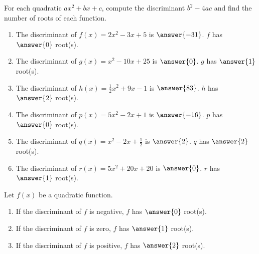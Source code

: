 \documentclass{ximera}
\author{Kenneth Berglund}
\begin{document}
For each quadratic $ax^2 + bx + c$, compute the discriminant $b^2 - 4ac$ and find the number of roots of each function. 

\begin{exercise}
\begin{enumerate}
\item The discriminant of $f(x) = 2x^2 - 3x + 5$ is $\answer{-31}$. $f$ has $\answer{0}$ root(s).

\item The discriminant of $g(x) = x^2 - 10x + 25$ is $\answer{0}$. $g$ has $\answer{1}$ root(s).

\item The discriminant of $h(x) = \frac{1}{2}x^2 + 9x - 1$ is $\answer{83}$. $h$ has $\answer{2}$ root(s). 

\item The discriminant of $p(x) = 5x^2 - 2x + 1$ is $\answer{-16}$. $p$ has $\answer{0}$ root(s). 

\item The discriminant of $q(x) = x^2 - 2x + \frac{1}{2}$ is $\answer{2}$. $q$ has $\answer{2}$ root(s). 

\item The discriminant of $r(x) = 5x^2 + 20x + 20$ is $\answer{0}$. $r$ has $\answer{1}$ root(s).
\end{enumerate}


\begin{exercise}
Let $f(x)$ be a quadratic function. 
\begin{enumerate}
\item If the discriminant of $f$ is negative, $f$ has $\answer{0}$ root(s).

\item If the discriminant of $f$ is zero, $f$ has $\answer{1}$ root(s).

\item If the discriminant of $f$ is positive, $f$ has $\answer{2}$ root(s).
\end{enumerate}
\end{exercise}
\end{exercise}
\end{document}
